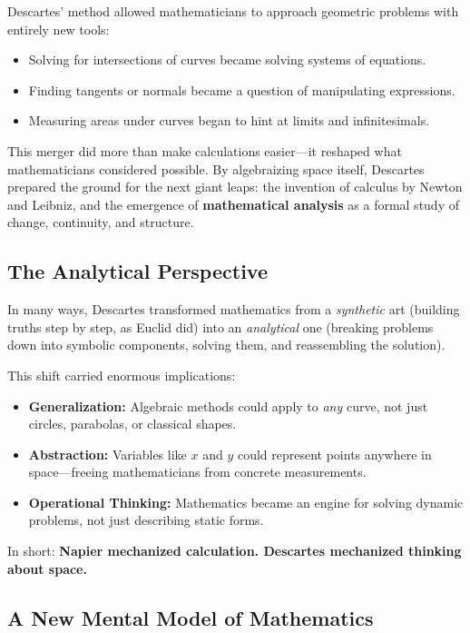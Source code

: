 Descartes’ method allowed mathematicians to approach geometric problems with entirely new tools:

\begin{itemize}
    \item Solving for intersections of curves became solving systems of equations.
    \item Finding tangents or normals became a question of manipulating expressions.
    \item Measuring areas under curves began to hint at limits and infinitesimals.
\end{itemize}

This merger did more than make calculations easier—it reshaped what mathematicians considered possible.  
By algebraizing space itself, Descartes prepared the ground for the next giant leaps: the invention of calculus by Newton and Leibniz, and the emergence of \textbf{mathematical analysis} as a formal study of change, continuity, and structure.

\subsection{The Analytical Perspective}

In many ways, Descartes transformed mathematics from a \textit{synthetic} art (building truths step by step, as Euclid did) into an \textit{analytical} one (breaking problems down into symbolic components, solving them, and reassembling the solution).

This shift carried enormous implications:

\begin{itemize}
    \item \textbf{Generalization:} Algebraic methods could apply to \textit{any} curve, not just circles, parabolas, or classical shapes.
    \item \textbf{Abstraction:} Variables like \(x\) and \(y\) could represent points anywhere in space—freeing mathematicians from concrete measurements.
    \item \textbf{Operational Thinking:} Mathematics became an engine for solving dynamic problems, not just describing static forms.
\end{itemize}

\medskip

In short:  
\textbf{Napier mechanized calculation. Descartes mechanized thinking about space.}

\subsection{A New Mental Model of Mathematics}

